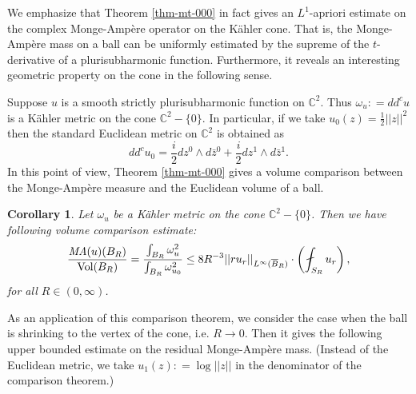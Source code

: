 \documentclass[a4paper,11pt]{amsart}
\numberwithin{equation}{section}
\newtheorem{cor}[theorem]{Corollary}
\def\Vol{\mathop{\rm Vol}\nolimits}
\let\ol=\overline
\def\bC{{\mathbb C}}
\begin{document}
We emphasize that Theorem \ref{thm-mt-000} in fact gives an $L^1$-apriori estimate 
on the complex Monge-Amp\`ere operator on the K\"ahler cone. 
That is, the Monge-Amp\`ere mass on a ball can be uniformly estimated by 
the supreme of the $t$-derivative of a plurisubharmonic function. 
Furthermore, 
it reveals an interesting geometric property on the cone in the following sense. 

Suppose $u$ is a smooth strictly plurisubharmonic function on $\bC^2$.
Thus $\omega_u: = dd^c u$ is a K\"ahler metric on the cone $\bC^2 - \{ 0 \}$. 
In particular, if we take $u_0(z) = \frac{1}{2} || z ||^2$ then the standard Euclidean metric on $\bC^2$ is obtained as 
$$ dd^c u_0 =  \frac{i}{2} dz^0 \wedge d\bar z^0 + \frac{i}{2}dz^1 \wedge d\bar z^1.$$
In this point of view, Theorem \ref{thm-mt-000} gives a volume comparison between 
the Monge-Amp\`ere measure and the Euclidean volume of a ball.

\begin{cor}
\label{cor-mt-000}
Let $\omega_u$ be a K\"ahler metric on the cone $\bC^2-\{0 \}$. 
Then we have following volume comparison estimate: 
\begin{equation}
\label{sub-0087}
\frac{\emph{MA}(u)(B_R)}{\Vol(B_R)}     = \frac{\int_{B_R} \omega_u^2}{ \int_{B_R} \omega_{u_0}^2}
\leq  8 R^{-3} || ru_r ||_{L^{\infty}(\ol{B}_R)}\cdot \left( \fint_{S_R} u_r \right),
\end{equation}
for all $R\in (0, \infty)$. 
\end{cor}
 



As an application of this comparison theorem, 
we consider the case when the ball is shrinking to the vertex of the cone, i.e. $R\rightarrow 0$. 
Then it gives the following upper bounded estimate on the residual Monge-Amp\`ere mass. 
(Instead of the Euclidean metric, we take $u_1 (z): = \log ||z||  $ in the denominator of the comparison theorem.) 
\end{document}
